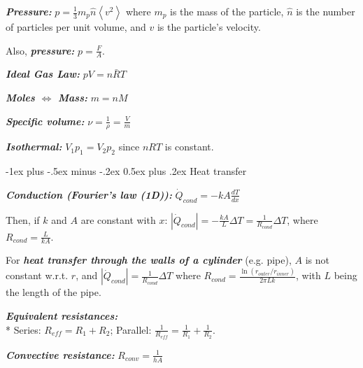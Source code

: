 \documentclass[10pt,landscape,letterpaper]{article}
\makeatletter
\renewcommand{\subsection}{\@startsection{subsection}{2}{0mm}%
                                {-1ex plus -.5ex minus -.2ex}%
                                {0.5ex plus .2ex}%
                                {\normalfont\normalsize\bfseries}}
\newcommand{\fsheetlabel}[1]{\textcolor{FSheetLabelColor}{\textbf{\textit{#1}}}}
\makeatother
\begin{document}
\begin{multicols*}{3}
\begin{minipage}{\columnwidth}
        \fsheetlabel{Pressure:} $p=\frac{1}{3} m_p \hat{n} \left\langle v^2 \right\rangle$ where $m_p$ is the mass of the particle, $\hat{n}$ is the number of particles per unit volume, and $v$ is the particle's velocity.
        
        Also, \fsheetlabel{pressure:} $p=\frac{F}{A}$.
        
        \fsheetlabel{Ideal Gas Law:} $pV=n\bar{R}T$
        
        \fsheetlabel{Moles $\Leftrightarrow$ Mass:} $m = nM$
        
        \fsheetlabel{Specific volume:} $\nu = \frac{1}{\rho} = \frac{V}{m}$
        
        \fsheetlabel{Isothermal:} $V_1 p_1 = V_2 p_2$ since $nRT$ is constant.
    \end{minipage}
    \vspace{2ex plus .5ex minus .5ex}
    
    \begin{minipage}{\columnwidth}\raggedright
        \subsection{Heat transfer}
        
        \fsheetlabel{Conduction (Fourier's law (1D)):} $\dot{Q}_{cond} = -kA\frac{dT}{dx}$
        
        Then, if $k$ and $A$ are constant with $x$: $\left|\dot{Q}_{cond}\right| = -\frac{kA}{L} \Delta T = \frac{1}{R_{cond}} \Delta T$, where $R_{cond} = \frac{L}{kA}$.
        
        For \fsheetlabel{heat transfer through the walls of a cylinder} (e.g. pipe), $A$ is not constant w.r.t. $r$, and $\left|\dot{Q}_{cond}\right| = \frac{1}{R_{cond}} \Delta T$ where $R_{cond} = \frac{\ln\left(r_{outer}/r_{inner}\right)}{2 \pi L k}$, with $L$ being the length of the pipe.
        
        \fsheetlabel{Equivalent resistances:}\\*
        Series: $R_{eff}=R_1+R_2$; Parallel: $\frac{1}{R_{eff}} = \frac{1}{R_1} + \frac{1}{R_2}.$
        
        \fsheetlabel{Convective resistance:} $R_{conv} = \frac{1}{hA}$
    \end{minipage}
    \vspace{2ex plus .5ex minus .5ex}
    

\end{multicols*}
\end{document}
